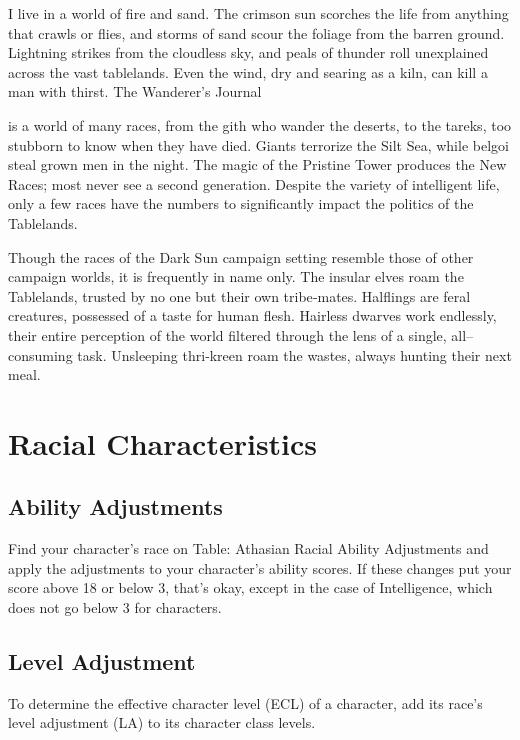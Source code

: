 \documentclass[10pt,a4paper,twocolumn]{d20}
\begin{document}
{I live in a world of fire and sand. The crimson sun scorches the life from anything that crawls or flies, and storms of sand scour the foliage from the barren ground. Lightning strikes from the cloudless sky, and peals of thunder roll unexplained across the vast tablelands. Even the wind, dry and searing as a kiln, can kill a man with thirst.}
{The Wanderer’s Journal}

 is a world of many races, from the gith who wander the deserts, to the tareks, too stubborn to know when they have died. Giants terrorize the Silt Sea, while belgoi steal grown men in the night. The magic of the Pristine Tower produces the New Races; most never see a second generation. Despite the variety of intelligent life, only a few races have the numbers to significantly impact the politics of the Tablelands.

Though the races of the Dark Sun campaign setting resemble those of other campaign worlds, it is frequently in name only. The insular elves roam the Tablelands, trusted by no one but their own tribe‐mates. Halflings are feral creatures, possessed of a taste for human flesh. Hairless dwarves work endlessly, their entire perception of the world filtered through the lens of a single, all–consuming task. Unsleeping thri‐kreen roam the wastes, always hunting their next meal.

\section{Racial Characteristics}

\subsection{Ability Adjustments}

Find your character’s race on Table: Athasian Racial Ability Adjustments and apply the adjustments to your character’s ability scores. If these changes put your score above 18 or below 3, that’s okay, except in the case of Intelligence, which does not go below 3 for characters.

\subsection{Level Adjustment}

To determine the effective character level (ECL) of a character, add its race’s level adjustment (LA) to its character class levels.
\end{document}
